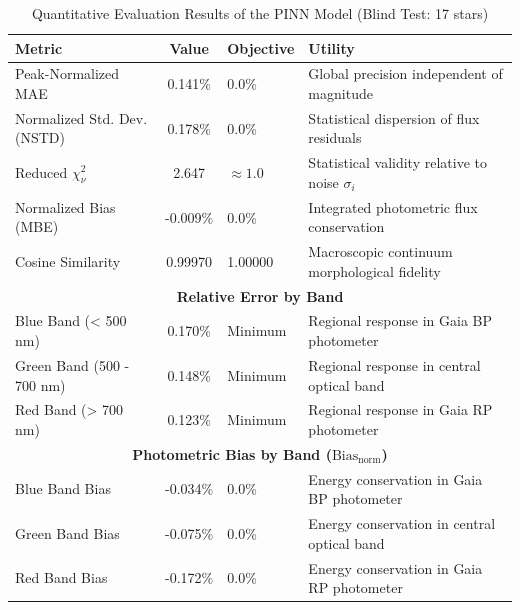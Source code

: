 
\begin{table}[htpb]
\centering
\caption{Quantitative Evaluation Results of the PINN Model (Blind Test: 17 stars)}
\label{tab:pinn_evaluation}
\begin{tabular}{lcll}
\hline
\textbf{Metric} & \textbf{Value} & \textbf{Objective} & \textbf{Utility} \\
\hline
Peak-Normalized MAE & 0.141\% & 0.0\% & Global precision independent of magnitude \\
Normalized Std. Dev. (NSTD) & 0.178\% & 0.0\% & Statistical dispersion of flux residuals \\
Reduced $\chi^2_\nu$ & 2.647 & $\approx 1.0$ & Statistical validity relative to noise $\sigma_i$ \\
Normalized Bias (MBE) & -0.009\% & 0.0\% & Integrated photometric flux conservation \\
Cosine Similarity & 0.99970 & 1.00000 & Macroscopic continuum morphological fidelity \\
\hline
\multicolumn{4}{c}{\textbf{Relative Error by Band}} \\
\hline
Blue Band (< 500 nm) & 0.170\% & Minimum & Regional response in Gaia BP photometer \\
Green Band (500 - 700 nm) & 0.148\% & Minimum & Regional response in central optical band \\
Red Band (> 700 nm) & 0.123\% & Minimum & Regional response in Gaia RP photometer \\
\hline
\multicolumn{4}{c}{\textbf{Photometric Bias by Band ($\text{Bias}_{\text{norm}}$)}} \\
\hline
Blue Band Bias & -0.034\% & 0.0\% & Energy conservation in Gaia BP photometer \\
Green Band Bias & -0.075\% & 0.0\% & Energy conservation in central optical band \\
Red Band Bias & -0.172\% & 0.0\% & Energy conservation in Gaia RP photometer \\
\hline
\end{tabular}
\end{table}
